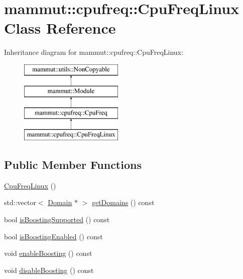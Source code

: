 \hypertarget{classmammut_1_1cpufreq_1_1CpuFreqLinux}{\section{mammut\-:\-:cpufreq\-:\-:Cpu\-Freq\-Linux Class Reference}
\label{classmammut_1_1cpufreq_1_1CpuFreqLinux}
}
Inheritance diagram for mammut\-:\-:cpufreq\-:\-:Cpu\-Freq\-Linux\-:\begin{figure}[H]
\begin{center}
\leavevmode
\includegraphics[height=4.000000cm]{classmammut_1_1cpufreq_1_1CpuFreqLinux}
\end{center}
\end{figure}
\subsection*{Public Member Functions}
\begin{DoxyCompactItemize}
\item 
\hyperlink{classmammut_1_1cpufreq_1_1CpuFreqLinux_ad80ab9dcd2a6c710c5b5734260dadb9c}{Cpu\-Freq\-Linux} ()
\item 
std\-::vector$<$ \hyperlink{classmammut_1_1cpufreq_1_1Domain}{Domain} $\ast$ $>$ \hyperlink{classmammut_1_1cpufreq_1_1CpuFreqLinux_a8c1129abc2edef364f1fabce4f434459}{get\-Domains} () const 
\item 
bool \hyperlink{classmammut_1_1cpufreq_1_1CpuFreqLinux_afe44ce09634cb70a4106d4b1c4fe7a16}{is\-Boosting\-Supported} () const 
\item 
bool \hyperlink{classmammut_1_1cpufreq_1_1CpuFreqLinux_a2c6cb213703975feac9b0170eb861f8d}{is\-Boosting\-Enabled} () const 
\item 
void \hyperlink{classmammut_1_1cpufreq_1_1CpuFreqLinux_a0c40ded518bf086d602f70035b29491b}{enable\-Boosting} () const 
\item 
void \hyperlink{classmammut_1_1cpufreq_1_1CpuFreqLinux_acb6ce2fcb128211bd899e0c057951db8}{disable\-Boosting} () const 
\end{DoxyCompactItemize}
